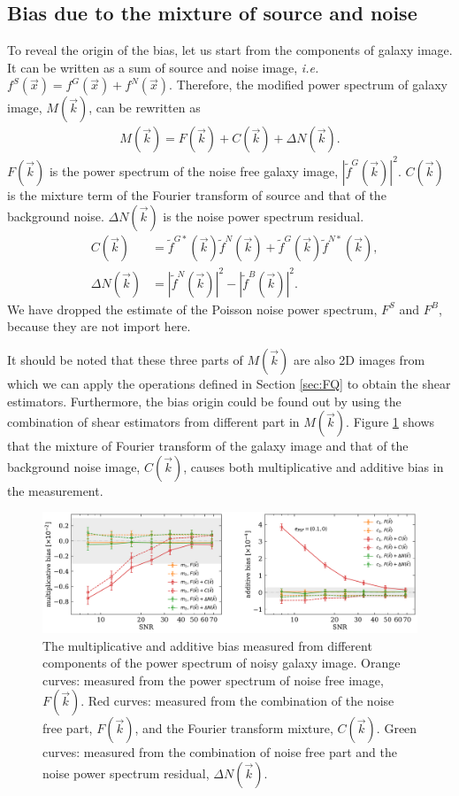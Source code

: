 \documentclass[twocolumn]{aastex62}
\def\ie{{\it i.e. }}
\begin{document}
\subsection{Bias due to the mixture of source and noise}
To reveal the origin of the bias, let us start from the components of galaxy image. It can be written as a sum of source and noise image, \ie$f^S(\vec{x}) = f^G(\vec{x}) + f^N(\vec{x})$. Therefore, the modified power spectrum of galaxy image, $M(\vec{k})$, can be rewritten as 
\begin{eqnarray}
M(\vec{k}) = F(\vec{k}) + C(\vec{k}) + \Delta N(\vec{k}).
\end{eqnarray}
$F(\vec{k})$ is the power spectrum of the noise free galaxy image, $\left\vert\widetilde{f}^G(\vec{k})\right\vert^2$. $C(\vec{k})$ is the mixture term of the Fourier transform of source and that of the background noise. $\Delta N(\vec{k})$ is the noise power spectrum residual. 
\begin{eqnarray}
&C(\vec{k})& = \widetilde{f}^{G*}(\vec{k})\widetilde{f}^N(\vec{k}) + \widetilde{f}^{G}(\vec{k})\widetilde{f}^{N*}(\vec{k}),\\ \nonumber
&\Delta N(\vec{k})& = \left\vert\widetilde{f}^N(\vec{k})\right\vert^2 -\left\vert\widetilde{f}^B(\vec{k})\right\vert^2.
\end{eqnarray}
We have dropped the estimate of the Poisson noise power spectrum, $F^S$ and $F^B$, because they are not import here. 

It should be noted that these three parts of $M(\vec{k})$ are also 2D images from which we can apply the operations defined in Section \ref{sec:FQ} to obtain the shear estimators. Furthermore, the bias origin could be found out by using the combination of shear estimators from different part in $M(\vec{k})$. Figure \ref{fig:pts_componets} shows that the mixture of Fourier transform of the galaxy image and that of the background noise image, $C(\vec{k})$, causes both multiplicative and additive bias in the measurement.
\begin{figure}[htbp]
	\centering
	\includegraphics[width=0.9\linewidth]{figures/pts_sample_components.pdf}
	\caption{The multiplicative and additive bias measured from different components of the power spectrum of noisy galaxy image. Orange curves: measured from the power spectrum of noise free image, $F(\vec{k})$. Red curves: measured from the combination of the noise free part, $F(\vec{k})$, and the Fourier transform mixture, $C(\vec{k})$. Green curves: measured from the combination of noise free part and the noise power spectrum residual, $\Delta N(\vec{k})$.}\label{fig:pts_componets}
\end{figure}
\end{document}

